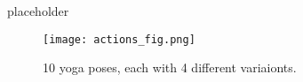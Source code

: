 \documentclass[
	a4paper, %
	10pt, %
	unnumberedsections, %
	twoside, %
]{t0004}
\begin{document}
placeholder






\begin{figure*}
	\texttt{[image: actions\_fig.png]}
	\caption{10 yoga poses, each with 4 different variaionts.}
	\label{fig:actionsfig}
\end{figure*}
\end{document}
